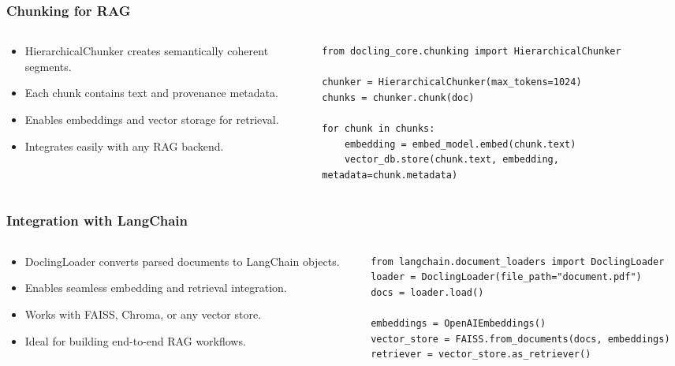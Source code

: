 \begin{frame}[fragile]\frametitle{Chunking for RAG}
\begin{columns}
    \begin{column}[T]{0.5\linewidth}
      \begin{itemize}
        \item HierarchicalChunker creates semantically coherent segments.
        \item Each chunk contains text and provenance metadata.
        \item Enables embeddings and vector storage for retrieval.
        \item Integrates easily with any RAG backend.
      \end{itemize}
    \end{column}
    \begin{column}[T]{0.5\linewidth}
      \begin{lstlisting}
from docling_core.chunking import HierarchicalChunker

chunker = HierarchicalChunker(max_tokens=1024)
chunks = chunker.chunk(doc)

for chunk in chunks:
    embedding = embed_model.embed(chunk.text)
    vector_db.store(chunk.text, embedding, metadata=chunk.metadata)
      \end{lstlisting}
    \end{column}
  \end{columns}
\end{frame}

\begin{frame}[fragile]\frametitle{Integration with LangChain}
\begin{columns}
    \begin{column}[T]{0.5\linewidth}
      \begin{itemize}
        \item DoclingLoader converts parsed documents to LangChain objects.
        \item Enables seamless embedding and retrieval integration.
        \item Works with FAISS, Chroma, or any vector store.
        \item Ideal for building end-to-end RAG workflows.
      \end{itemize}
    \end{column}
    \begin{column}[T]{0.5\linewidth}
      \begin{lstlisting}
from langchain.document_loaders import DoclingLoader
loader = DoclingLoader(file_path="document.pdf")
docs = loader.load()

embeddings = OpenAIEmbeddings()
vector_store = FAISS.from_documents(docs, embeddings)
retriever = vector_store.as_retriever()
      \end{lstlisting}
    \end{column}
  \end{columns}
\end{frame}




